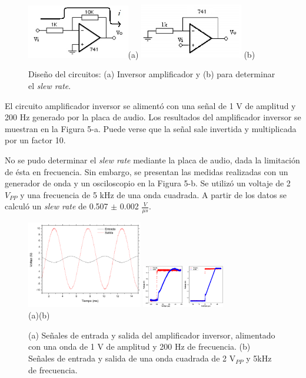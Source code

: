 \documentclass[a4paper,10pt]{article}
\begin{document}
\begin{figure}[h]
 \centering
 \includegraphics[width=0.4\textwidth]{AmpInv.png}(a)
 \hspace{0.1cm}
 \includegraphics[width=0.4\textwidth]{slewratecircuit.png}
 (b)
 \label{fig:opamp}
 \caption{Diseño del circuitos: (a) Inversor amplificador y (b) para determinar el {\it slew rate}.}
\end{figure}

El circuito amplificador inversor se alimentó con una señal de 1 V de amplitud y 200 Hz generado por la placa de audio. Los resultados del amplificador inversor se muestran en la Figura 5-a. Puede verse que la señal sale invertida y multiplicada por un factor 10. 

No se pudo determinar el {\it slew rate} mediante la placa de audio, dada la limitación de ésta en frecuencia. Sin embargo, se presentan las medidas realizadas con un generador de onda y un osciloscopio en la Figura 5-b. Se utilizó un voltaje de 2~$V_{PP}$ y una frecuencia de 5 kHz de una onda cuadrada. A partir de los datos se calculó un {\it slew rate} de 0.507 $\pm$ 0.002 $\frac{V}{\mu s}$.

\begin{figure}[H]
 \centering
 \includegraphics[width=0.45\textwidth]{AmplificadorInversor.jpg} 
 \includegraphics[trim={0 0 13cm 0},clip, width=0.32\textwidth]{slewrate.eps}
 \\
 \hspace{0.2cm}(a)\hspace{4.5cm}(b)
 \label{fig:slewrate}
 \caption{(a) Señales de entrada y salida del amplificador inversor, alimentado con una onda de 1 V de amplitud y 200 Hz de frecuencia. (b) Señales de entrada y salida de una onda cuadrada de
 2 V$_{PP}$ y 5kHz de frecuencia.}
\end{figure}
\end{document}
